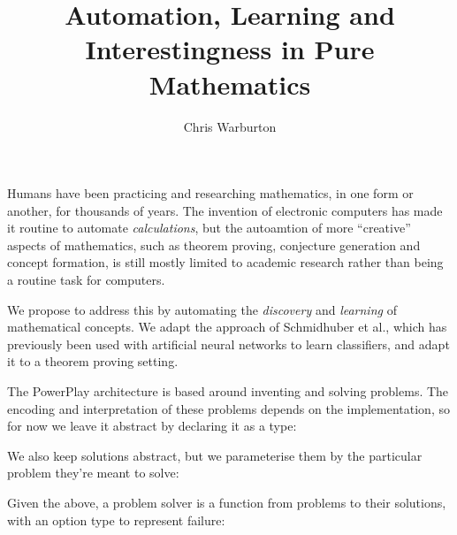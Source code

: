 \documentclass[]{article}
\begin{document}
\title{Automation, Learning and Interestingness in Pure Mathematics}

\author{Chris Warburton}

\maketitle              %

Humans have been practicing and researching mathematics, in one form or another,
for thousands of years. The invention of electronic computers has made it
routine to automate \emph{calculations}, but the autoamtion of more ``creative''
aspects of mathematics, such as theorem proving, conjecture generation and
concept formation, is still mostly limited to academic research rather than
being a routine task for computers.

We propose to address this by automating the \emph{discovery} and
\emph{learning} of mathematical concepts. We adapt the approach of Schmidhuber
et al., which has previously been used with artificial neural networks to learn
classifiers, and adapt it to a theorem proving setting.


The PowerPlay architecture is based around inventing and solving problems. The
encoding and interpretation of these problems depends on the implementation, so
for now we leave it abstract by declaring it as a type:


We also keep solutions abstract, but we parameterise them by the particular
problem they're meant to solve:


Given the above, a problem solver is a function from problems to their
solutions, with an option type to represent failure:




\end{document}
